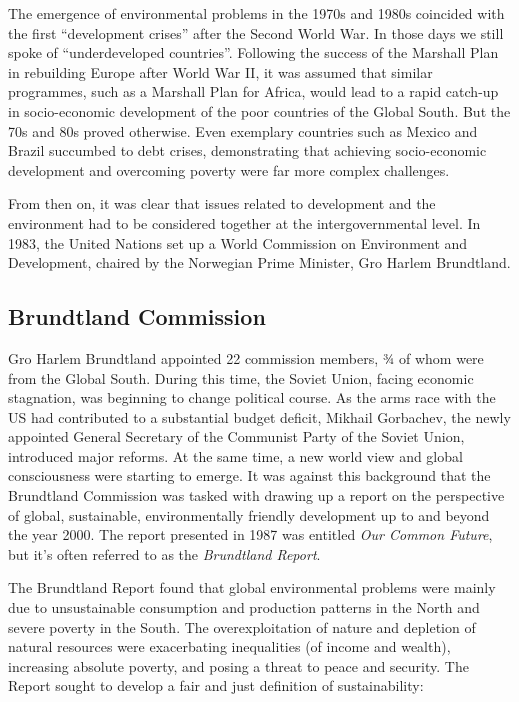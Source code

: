 \documentclass[
  a4paper,
  openany]{book}
\begin{document}
The emergence of environmental problems in the 1970s and 1980s coincided
with the first ``development crises'' after the Second World War. In
those days we still spoke of ``underdeveloped countries''. Following the
success of the Marshall Plan in rebuilding Europe after World War II, it
was assumed that similar programmes, such as a Marshall Plan for Africa,
would lead to a rapid catch-up in socio-economic development of the poor
countries of the Global South. But the 70s and 80s proved otherwise.
Even exemplary countries such as Mexico and Brazil succumbed to debt
crises, demonstrating that achieving socio-economic development and
overcoming poverty were far more complex challenges.

From then on, it was clear that issues related to development and the
environment had to be considered together at the intergovernmental
level. In 1983, the United Nations set up a World Commission on
Environment and Development, chaired by the Norwegian Prime Minister,
Gro Harlem Brundtland.

\subsection{Brundtland Commission}\label{brundtland-commission}

Gro Harlem Brundtland appointed 22 commission members, ¾ of whom were
from the Global South. During this time, the Soviet Union, facing
economic stagnation, was beginning to change political course. As the
arms race with the US had contributed to a substantial budget deficit,
Mikhail Gorbachev, the newly appointed General Secretary of the
Communist Party of the Soviet Union, introduced major reforms. At the
same time, a new world view and global consciousness were starting to
emerge. It was against this background that the Brundtland Commission
was tasked with drawing up a report on the perspective of global,
sustainable, environmentally friendly development up to and beyond the
year 2000. The report presented in 1987 was entitled \emph{Our Common
Future}, but it's often referred to as the \emph{Brundtland Report}.

The Brundtland Report found that global environmental problems were
mainly due to unsustainable consumption and production patterns in the
North and severe poverty in the South. The overexploitation of nature
and depletion of natural resources were exacerbating inequalities (of
income and wealth), increasing absolute poverty, and posing a threat to
peace and security. The Report sought to develop a fair and just
definition of sustainability:
\end{document}
